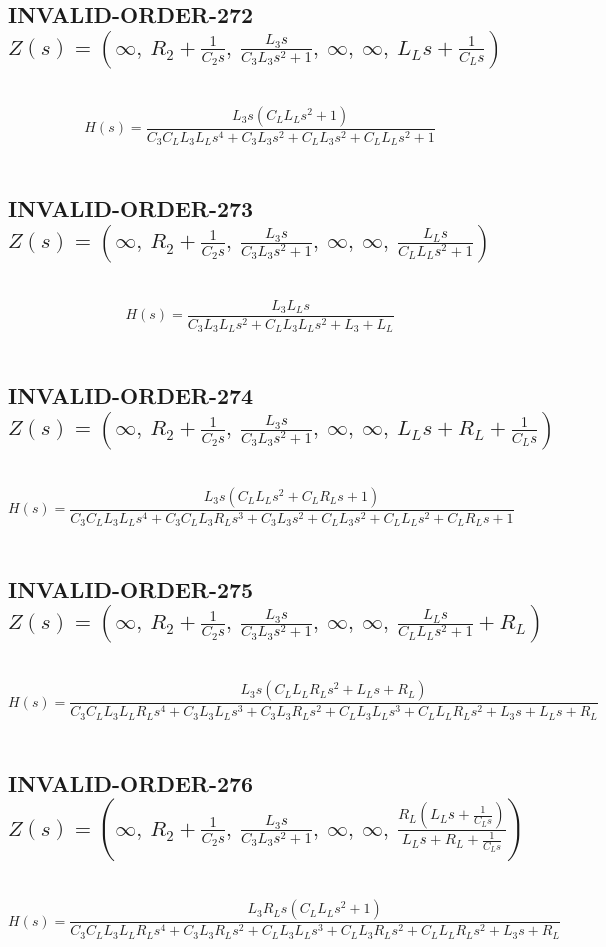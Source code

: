 \documentclass{article}
\begin{document}
\subsection{INVALID-ORDER-272 $Z(s) = \left( \infty, \  R_{2} + \frac{1}{C_{2} s}, \  \frac{L_{3} s}{C_{3} L_{3} s^{2} + 1}, \  \infty, \  \infty, \  L_{L} s + \frac{1}{C_{L} s}\right)$ } \ 
\textbf{\[H(s) = \frac{L_{3} s \left(C_{L} L_{L} s^{2} + 1\right)}{C_{3} C_{L} L_{3} L_{L} s^{4} + C_{3} L_{3} s^{2} + C_{L} L_{3} s^{2} + C_{L} L_{L} s^{2} + 1}\] } \ 
\subsection{INVALID-ORDER-273 $Z(s) = \left( \infty, \  R_{2} + \frac{1}{C_{2} s}, \  \frac{L_{3} s}{C_{3} L_{3} s^{2} + 1}, \  \infty, \  \infty, \  \frac{L_{L} s}{C_{L} L_{L} s^{2} + 1}\right)$ } \ 
\textbf{\[H(s) = \frac{L_{3} L_{L} s}{C_{3} L_{3} L_{L} s^{2} + C_{L} L_{3} L_{L} s^{2} + L_{3} + L_{L}}\] } \ 
\subsection{INVALID-ORDER-274 $Z(s) = \left( \infty, \  R_{2} + \frac{1}{C_{2} s}, \  \frac{L_{3} s}{C_{3} L_{3} s^{2} + 1}, \  \infty, \  \infty, \  L_{L} s + R_{L} + \frac{1}{C_{L} s}\right)$ } \ 
\textbf{\[H(s) = \frac{L_{3} s \left(C_{L} L_{L} s^{2} + C_{L} R_{L} s + 1\right)}{C_{3} C_{L} L_{3} L_{L} s^{4} + C_{3} C_{L} L_{3} R_{L} s^{3} + C_{3} L_{3} s^{2} + C_{L} L_{3} s^{2} + C_{L} L_{L} s^{2} + C_{L} R_{L} s + 1}\] } \ 
\subsection{INVALID-ORDER-275 $Z(s) = \left( \infty, \  R_{2} + \frac{1}{C_{2} s}, \  \frac{L_{3} s}{C_{3} L_{3} s^{2} + 1}, \  \infty, \  \infty, \  \frac{L_{L} s}{C_{L} L_{L} s^{2} + 1} + R_{L}\right)$ } \ 
\textbf{\[H(s) = \frac{L_{3} s \left(C_{L} L_{L} R_{L} s^{2} + L_{L} s + R_{L}\right)}{C_{3} C_{L} L_{3} L_{L} R_{L} s^{4} + C_{3} L_{3} L_{L} s^{3} + C_{3} L_{3} R_{L} s^{2} + C_{L} L_{3} L_{L} s^{3} + C_{L} L_{L} R_{L} s^{2} + L_{3} s + L_{L} s + R_{L}}\] } \ 
\subsection{INVALID-ORDER-276 $Z(s) = \left( \infty, \  R_{2} + \frac{1}{C_{2} s}, \  \frac{L_{3} s}{C_{3} L_{3} s^{2} + 1}, \  \infty, \  \infty, \  \frac{R_{L} \left(L_{L} s + \frac{1}{C_{L} s}\right)}{L_{L} s + R_{L} + \frac{1}{C_{L} s}}\right)$ } \ 
\textbf{\[H(s) = \frac{L_{3} R_{L} s \left(C_{L} L_{L} s^{2} + 1\right)}{C_{3} C_{L} L_{3} L_{L} R_{L} s^{4} + C_{3} L_{3} R_{L} s^{2} + C_{L} L_{3} L_{L} s^{3} + C_{L} L_{3} R_{L} s^{2} + C_{L} L_{L} R_{L} s^{2} + L_{3} s + R_{L}}\] } \ 
\end{document}
